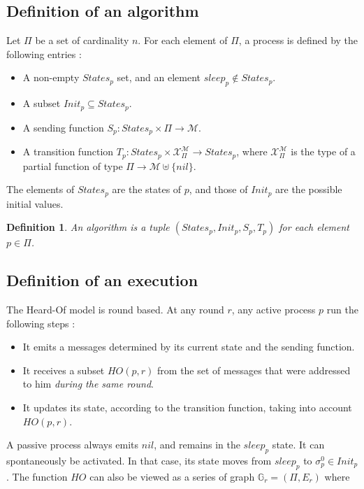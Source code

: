 \documentclass{article}
\newtheorem{definition}{Definition}
\begin{document}
\subsection{Definition of an algorithm}

Let $\Pi$ be a set of cardinality $n$. For each element of $\Pi$, a process is defined by the following entries :

\begin{itemize}
	\item A non-empty $States_p$ set, and an element $sleep_p \notin States_p$.
	\item A subset $Init_p \subseteq States_p$.
	\item A sending function $S_p : States_p \times \Pi \rightarrow \mathcal{M}$.
	\item A transition function $T_p : States_p \times \mathcal{X}_\Pi^{\mathcal{M}} \rightarrow States_p$,
		where $\mathcal{X}_\Pi^{\mathcal{M}}$ is the type of a partial function
		of type $\Pi \rightarrow \mathcal{M} \uplus \{nil\}$.
\end{itemize}

The elements of $States_p$ are the states of $p$, and those of $Init_p$ are the possible initial values.

\begin{definition}
	An algorithm is a tuple $(States_p, Init_p, S_p, T_p)$ for each element $p \in \Pi$.
\end{definition}


\subsection{Definition of an execution}

The Heard-Of model is round based. At any round $r$, any active process $p$ run the following steps :

\begin{itemize}
	\item It emits a messages determined by its current state and the sending function.
	\item It receives a subset $HO(p,r)$ from the set of messages that were addressed to him
		\textit{during the same round}.
	\item It updates its state, according to the transition function, taking into account $HO(p,r)$.
\end{itemize}

A passive process always emits $nil$, and remains in the $sleep_p$ state.
It can spontaneously be activated. In that case, its state moves from $sleep_p$ to $\sigma^0_p \in Init_p$.
The function $HO$ can also be viewed as a series of graph $\mathds{G}_r = (\Pi, E_r)$ where
\end{document}
